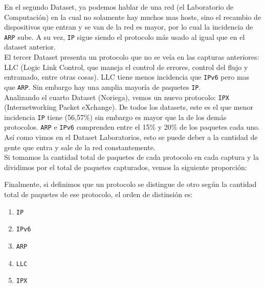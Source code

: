 En el segundo Dataset, ya podemos hablar de una red (el Laboratorio de Computación) en la cual no solamente hay muchos mas hosts, sino el recambio de dispositivos que entran y se van de la red es mayor, por lo cual la incidencia de \texttt{ARP} sube. A su vez, \texttt{IP} sigue siendo el protocolo más usado al igual que en el dataset anterior. \\

El tercer Dataset presenta un protocolo que no se veía en las capturas anteriores: LLC (Logic Link Control, que maneja el control de errores, control del flujo y entramado, entre otras cosas). LLC tiene menos incidencia que \texttt{IPv6} pero mas que \texttt{ARP}. Sin embargo hay una amplia mayoría de paquetes \texttt{IP}. \\

Analizando el cuarto Dataset (Noriega), vemos un nuevo protocolo: \texttt{IPX} (Internetworking Packet eXchange). De todos los datasets, este es el que menor incidencia \texttt{IP} tiene (56,57\%) sin embargo es mayor que la de los demás protocolos. \texttt{ARP} e \texttt{IPv6} comprenden entre el 15\% y 20\% de los paquetes cada uno. Así como vimos en el Dataset Laboratorios, esto se puede deber a la cantidad de gente que entra y sale de la red constantemente. \\

Si tomamos la cantidad total de paquetes de cada protocolo en cada captura y la dividimos por el total de paquetes capturados, vemos la siguiente proporción: \\

\begin{center}
\end{center}

Finalmente, si definimos que un protocolo se distingue de otro según la cantidad total de paquetes de ese protocolo, el orden de distinsión es:

\begin{enumerate}
\item \texttt{IP}
\item \texttt{IPv6}
\item \texttt{ARP}
\item \texttt{LLC}
\item \texttt{IPX}
\end{enumerate}

